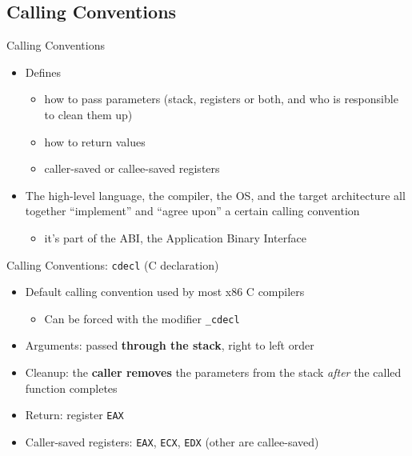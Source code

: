 \documentclass[]{beamer}
\begin{document}
\subsection{Calling Conventions}

\begin{frame}{Calling Conventions}
  \begin{itemize}
  	\item Defines
		\begin{itemize}
		\item how to pass parameters (stack, registers or both, and who is responsible to clean them up)
		\item how to return values
		\item caller-saved or callee-saved registers
		\end{itemize}
	\item The high-level language, the compiler, the OS, and the target architecture all together ``implement'' and ``agree upon'' a certain calling convention
    \begin{itemize}
    	\item it's part of the \alert{ABI}, the Application Binary Interface
    \end{itemize}
 \end{itemize}
\end{frame}


\begin{frame}{Calling Conventions: {\tt cdecl} (C declaration)}
  \begin{itemize}
  \item Default calling convention used by most x86 C compilers
  \begin{itemize}
  	\item Can be forced with the modifier \alert{\tt \_cdecl}
  \end{itemize}
  \item Arguments: passed \textbf{through the stack}, right to left order
  \item Cleanup: the \textbf{caller removes} the parameters from the stack \emph{after} the called function completes
  \item Return: register {\tt EAX}
  \item Caller-saved registers: {\tt EAX}, {\tt ECX}, {\tt EDX} (other are callee-saved)
  \end{itemize}
\end{frame}
\end{document}
